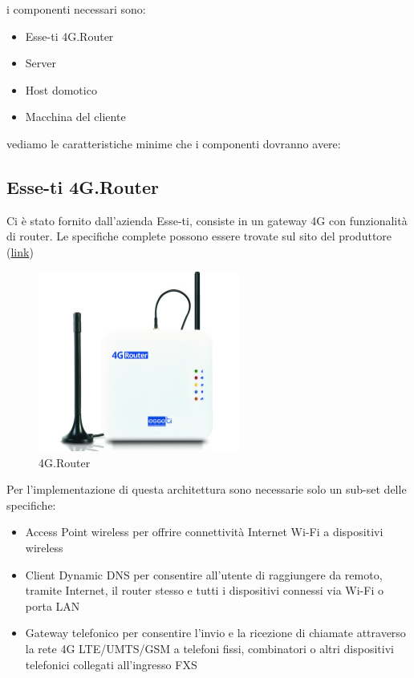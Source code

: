 i componenti necessari sono:

\begin{itemize}
	\item Esse-ti 4G.Router
	\item Server
	\item Host domotico
	\item Macchina del cliente
\end{itemize}

vediamo le caratteristiche minime che i componenti dovranno avere:

\subsection{Esse-ti 4G.Router}

Ci è stato fornito dall'azienda Esse-ti, consiste in un gateway 4G con funzionalità di router. Le specifiche complete possono essere trovate sul sito del produttore (\href{https://www.esse-ti.it/4g-router}{link})


\begin{figure}[ht]
	\centering
	\includegraphics[width=250px]{immagini/4grouter.jpg}
	\caption{4G.Router}

	\label{fig:esse-ti-router-4g}

\end{figure}

Per l'implementazione di questa architettura sono necessarie solo un sub-set delle specifiche:

\begin{itemize}
	\item Access Point wireless per offrire connettività Internet Wi-Fi a dispositivi wireless
	\item Client Dynamic DNS per consentire all’utente di raggiungere da remoto, tramite Internet, il router stesso e tutti i dispositivi connessi via Wi-Fi o porta LAN
	\item Gateway telefonico per consentire l’invio e la ricezione di chiamate attraverso la rete 4G LTE/UMTS/GSM a telefoni fissi, combinatori o altri dispositivi telefonici collegati all’ingresso FXS
\end{itemize}

